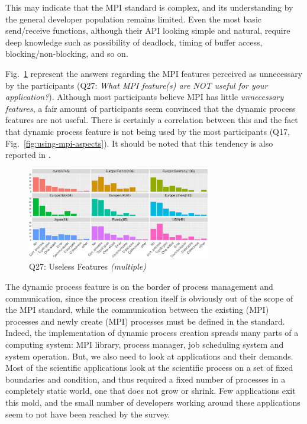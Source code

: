 \documentclass[preprint,5p,times]{elsarticle}
\def\myquote#1{{\it #1}}
\begin{document}
This may indicate that the MPI standard is complex, and its understanding by the
general developer population remains limited. Even the most basic send/receive
functions, although their API looking simple and natural, require deep knowledge
such as possibility of deadlock, timing of buffer access, blocking/non-blocking,
and so on.

Fig.~\ref{fig:useless-features} represent the answers regarding the MPI features
perceived as unnecessary by the participants (Q27: \myquote{What MPI feature(s)
are NOT useful for your application?}). Although most participants believe MPI
has little {\it unnecessary features}, a fair amount of participants seem
convinced that the dynamic process features are not useful. There is certainly a
correlation between this and the fact that dynamic process feature is not being
used by the most participants (Q17, Fig.~\ref{fig:using-mpi-aspects}). It should
be noted that this tendency is also reported in \cite{10.1145/3295500.3356176}.

\begin{figure}[htb]
  \begin{center}
    \includegraphics[width=8.0cm]{R-scripts/Q27.pdf}
    \vspace{-2mm}
    \caption{Q27: Useless Features {\it(multiple)}}
    \label{fig:useless-features}
  \end{center}
\end{figure}

The dynamic process feature is on the border of process management and
communication, since the process creation itself is obviously out of the scope
of the MPI standard, while the communication between the existing (MPI)
processes and newly create (MPI) processes must be defined in the standard.
Indeed, the implementation of dynamic process creation spreads many parts of a
computing system: MPI library, process manager, job scheduling system and system
operation.
%
But, we also need to look at applications and their demands. Most of the
scientific applications look at the scientific process on a set of fixed
boundaries and condition, and thus required a fixed number of processes in a
completely static world, one that does not grow or shrink. Few applications exit
this mold, and the small number of developers working around these applications
seem to not have been reached by the survey.
\end{document}
